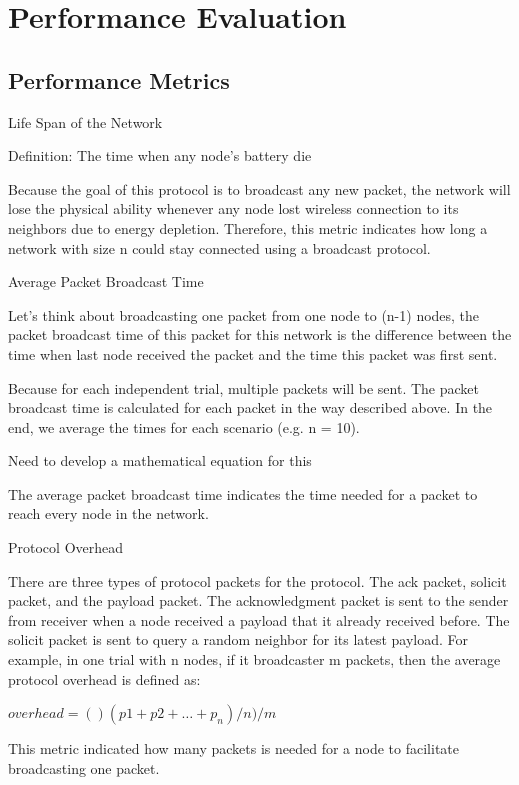 \chapter{Performance Evaluation}
\label{Chapter5}

\section{Performance Metrics}
Life Span of the Network

Definition: The time when any node's battery die

Because the goal of this protocol is to broadcast any new packet, the network will lose the physical ability whenever any node lost wireless connection to its neighbors due to energy depletion. Therefore, this metric indicates how long a network with size n could stay connected using a broadcast protocol.

Average Packet Broadcast Time

Let's think about broadcasting one packet from one node to (n-1) nodes, the packet broadcast time of this packet for this network is the difference between the time when last node received the packet and the time this packet was first sent.

Because for each independent trial, multiple packets will be sent. The packet broadcast time is calculated for each packet in the way described above. In the end, we average the times for each scenario (e.g. n = 10). 

Need to develop a mathematical equation for this

The average packet broadcast time indicates the time needed for a packet to reach every node in the network.

Protocol Overhead

There are three types of protocol packets for the protocol. The ack packet, solicit packet, and the payload packet. The acknowledgment packet is sent to the sender from receiver when a node received a payload that it already received before. The solicit packet is sent to query a random neighbor for its latest payload. For example, in one trial with n nodes, if it broadcaster m packets, then the average protocol overhead is defined as:

$overhead = ()(p1 + p2 + … + p_n) / n) / m$

This metric indicated how many packets is needed for a node to facilitate broadcasting one packet. 

